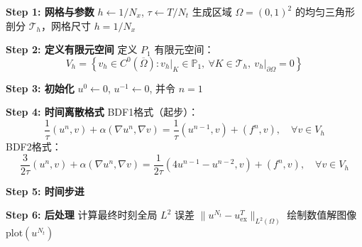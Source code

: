 \documentclass{GZUbachelorthesis}
\theoremstyle{chineseplain}
\begin{document}
\begin{algorithm}
	\caption{BDF2-P1格式数值求解二维情形}
	\label{alg:BDF2_optimized}
	\BlankLine
	\textbf{Step 1: 网格与参数}\;
	$h \gets 1/N_x$, $\tau \gets T/N_t$\;
	生成区域 $\Omega = (0,1)^2$ 的均匀三角形剖分 $\mathcal{T}_h$，网格尺寸 $h = 1/N_x$\;
	
	\BlankLine
	\textbf{Step 2: 定义有限元空间}\;
	定义 $P_1$ 有限元空间：
	\[
	V_h = \left\{ v_h \in C^0(\overline{\Omega}): \left. v_h \right|_K \in \mathbb{P}_1,\ \forall K \in \mathcal{T}_h,\ \left. v_h \right|_{\partial\Omega}=0 \right\}
	\]
	
	\BlankLine
	\textbf{Step 3: 初始化}\;
	$u^0 \gets 0$, $u^{-1} \gets 0$, 并令 $n = 1$\;
	
	\BlankLine
	\textbf{Step 4: 时间离散格式}\;
	BDF1格式（起步）：
	\[
	\frac{1}{\tau}(u^n, v) + \alpha(\nabla u^n, \nabla v) = \frac{1}{\tau}(u^{n-1}, v) + (f^n, v), \quad \forall v \in V_h
	\]
	BDF2格式：
	\[
	\frac{3}{2\tau}(u^n, v) + \alpha(\nabla u^n, \nabla v) = \frac{1}{2\tau}(4u^{n-1} - u^{n-2}, v) + (f^n, v), \quad \forall v \in V_h
	\]
	
	\BlankLine
	\textbf{Step 5: 时间步进}\;
	
	\BlankLine
	\textbf{Step 6: 后处理}\;
	计算最终时刻全局 $L^2$ 误差 $\|u^{N_t} - u_{\text{ex}}^T\|_{L^2(\Omega)}$\;
	绘制数值解图像 $\text{plot}(u^{N_t})$\;
	\;
\end{algorithm}
\clearpage
\end{document}
